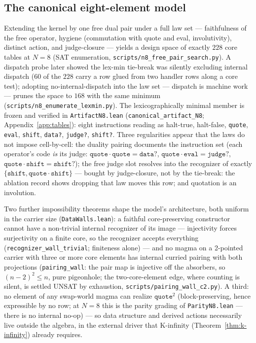 \documentclass[sigconf,screen]{acmart}
\newcommand{\dotop}{\cdot}
\theoremstyle{remark}
\begin{document}
\subsection{The canonical eight-element model}
\label{sec:canonical-model}

Extending the kernel by one free dual pair under a full law set ---
faithfulness of the free operator, hygiene (commutation with quote and
eval, involutivity), distinct action, and judge-closure --- yields a
design space of exactly $228$ core tables at $N\!=\!8$ (SAT
enumeration, \texttt{scripts/n8\_free\_pair\_search.py}). A dispatch
probe later showed the lex-min tie-break was silently excluding
internal dispatch ($60$ of the $228$ carry a row glued from two
handler rows along a core test); adopting no-internal-dispatch into
the law set --- dispatch is machine work --- prunes the space to
$168$ with the same minimum
(\texttt{scripts/n8\_enumerate\_lexmin.py}). The lexicographically
minimal member is frozen and verified in \texttt{ArtifactN8.lean}
(\texttt{canonical\_artifact\_N8}; Appendix~\ref{app:tables}): eight
instructions reading as halt-true, halt-false, \texttt{quote},
\texttt{eval}, \texttt{shift}, \texttt{data?}, \texttt{judge?},
\texttt{shift?}. Three regularities appear that the laws do not
impose cell-by-cell: the duality pairing documents the instruction
set (each operator's code \emph{is} its judge:
$\texttt{quote} \dotop \texttt{quote} = \texttt{data?}$,
$\texttt{quote} \dotop \texttt{eval} = \texttt{judge?}$,
$\texttt{quote} \dotop \texttt{shift} = \texttt{shift?}$); the free
judge slot resolves into the recognizer of exactly
$\{\texttt{shift}, \texttt{quote} \dotop \texttt{shift}\}$ --- bought
by judge-closure, not by the tie-break: the ablation record shows
dropping that law moves this row; and quotation is an involution.

Two further impossibility theorems shape the model's architecture,
both uniform in the carrier size (\texttt{DataWalls.lean}): a faithful
core-preserving constructor cannot have a non-trivial internal
recognizer of its image --- injectivity forces surjectivity on a
finite core, so the recognizer accepts everything
(\texttt{recognizer\_wall\_trivial}; finiteness alone) --- and no
magma on a 2-pointed carrier with three or more core elements has
internal curried pairing with both projections
(\texttt{pairing\_wall}: the pair map is injective off the absorbers,
so $(n-2)^2 \leq n$, pure pigeonhole; the two-core-element edge,
where counting is silent, is settled UNSAT by exhaustion,
\texttt{scripts/pairing\_wall\_c2.py}). A third: no
element of any swap-world magma can realize $\texttt{quote}^2$
(block-preserving, hence expressible by no row; at $N\!=\!8$ this is
the parity grading of \texttt{ParityN8.lean} --- there is no internal
no-op) --- so data structure
and derived actions necessarily live outside the algebra, in the
external driver that K-infinity (Theorem~\ref{thm:k-infinity}) already
requires.
\end{document}
